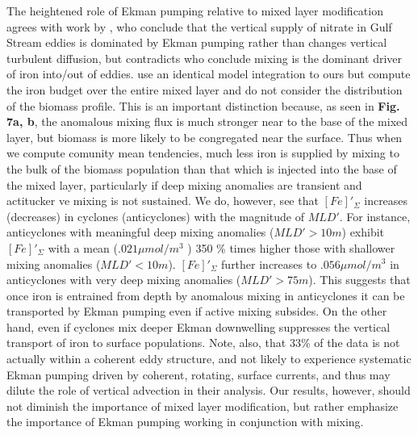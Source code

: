 The heightened role of Ekman pumping relative to mixed layer modification agrees with work by \textcite{ZhangImpactsMesoscaleEddies2018}, who conclude that the vertical supply of nitrate in Gulf Stream eddies is dominated by Ekman pumping rather than changes vertical turbulent diffusion, but contradicts \textcite{SongSeasonalvariationcorrelation2018} who conclude mixing is the dominant driver of iron into/out of eddies. \textcite{SongSeasonalvariationcorrelation2018} use an identical model integration to ours but compute the iron budget over the entire mixed layer and do not consider the distribution of the biomass profile. This is an important distinction because, as seen in \textbf{Fig. 7a, b}, the anomalous mixing flux is much stronger near to the base of the mixed layer, but biomass is more likely to be congregated near the surface. Thus when we compute comunity mean tendencies, much less iron is supplied by mixing to the bulk of the biomass population than that which is injected into the base of the mixed layer, particularly if deep mixing anomalies are transient and actitucker
ve mixing is not sustained. We do, however, see that $[Fe]'_\Sigma$ increases (decreases) in cyclones (anticyclones) with the magnitude of $MLD'$. For instance, anticyclones with meaningful deep mixing anomalies ($MLD'>10m$) exhibit $[Fe]'_\Sigma$ with a mean ($.021 \mu mol/m^3$ ) 350 \% times higher those with shallower mixing anomalies ($MLD'<10m$).  $[Fe]'_\Sigma$ further increases to $.056 \mu mol/m^3$ in anticyclones with very deep mixing anomalies ($MLD'>75m$). This suggests that once iron is entrained from depth by anomalous mixing in anticyclones it can be transported by Ekman pumping even if active mixing subsides. On the other hand, even if cyclones mix deeper Ekman downwelling suppresses the vertical transport of iron to surface populations. Note, also, that 33\% of the \textcite{SongSeasonalvariationcorrelation2018} data is not actually within a coherent eddy structure, and not likely to experience systematic Ekman pumping driven by coherent, rotating, surface currents, and thus may dilute the role of vertical advection in their analysis. Our results, however, should not diminish the importance of mixed layer modification, but rather emphasize the importance of Ekman pumping working in conjunction with mixing. 

